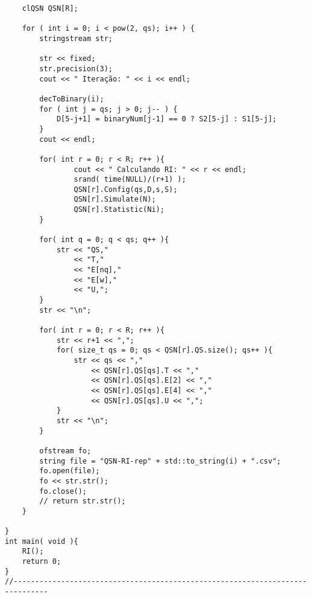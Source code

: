 \begin{lstlisting}
    clQSN QSN[R];

    for ( int i = 0; i < pow(2, qs); i++ ) {
        stringstream str;

        str << fixed;
        str.precision(3);
        cout << " Iteração: " << i << endl;

        decToBinary(i);
        for ( int j = qs; j > 0; j-- ) {
            D[5-j+1] = binaryNum[j-1] == 0 ? S2[5-j] : S1[5-j];
        }
        cout << endl;

        for( int r = 0; r < R; r++ ){
                cout << " Calculando RI: " << r << endl;
                srand( time(NULL)/(r+1) );
                QSN[r].Config(qs,D,s,S);
                QSN[r].Simulate(N);
                QSN[r].Statistic(Ni);
        }

        for( int q = 0; q < qs; q++ ){
            str << "QS,"
                << "T,"
                << "E[nq],"
                << "E[w],"
                << "U,";
        }
        str << "\n";

        for( int r = 0; r < R; r++ ){
            str << r+1 << ",";
            for( size_t qs = 0; qs < QSN[r].QS.size(); qs++ ){
                str << qs << ","
                    << QSN[r].QS[qs].T << ","
                    << QSN[r].QS[qs].E[2] << ","
                    << QSN[r].QS[qs].E[4] << ","
                    << QSN[r].QS[qs].U << ",";
            }
            str << "\n";
        }

        ofstream fo;
        string file = "QSN-RI-rep" + std::to_string(i) + ".csv";
        fo.open(file);
        fo << str.str();
        fo.close();
        // return str.str();
    }

}
int main( void ){
    RI();
    return 0;
}
//------------------------------------------------------------------------------
\end{lstlisting}